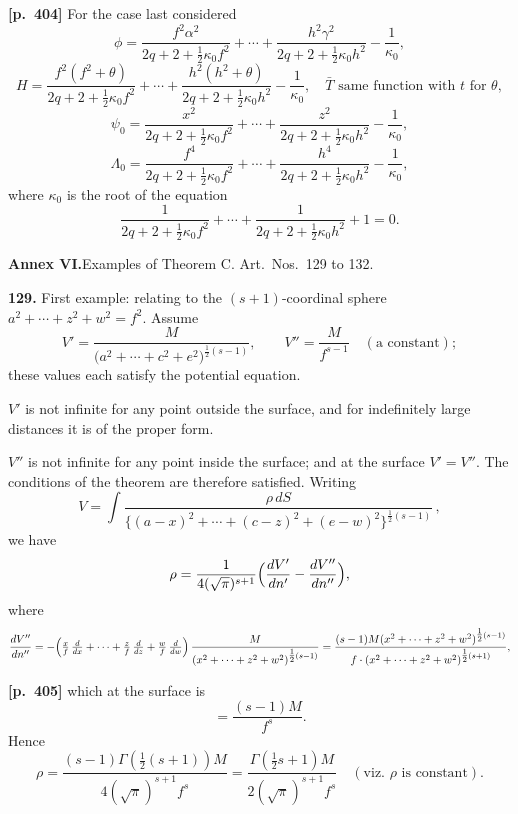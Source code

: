 \documentclass[11pt,a4paper]{article}
\begin{document}
\noindent\textbf{[p.~404]}\quad
For the case last considered
\[
\phi = \frac{f^{2}\alpha^{2}}{2q + 2 + \tfrac{1}{2}\kappa_{0} f^{2}} + \cdots + \frac{h^{2}\gamma^{2}}{2q + 2 + \tfrac{1}{2}\kappa_{0} h^{2}} - \frac{1}{\kappa_{0}},
\]
\[
H = \frac{f^{2}(f^{2}+\theta)}{2q + 2 + \tfrac{1}{2}\kappa_{0} f^{2}} + \cdots + \frac{h^{2}(h^{2}+\theta)}{2q + 2 + \tfrac{1}{2}\kappa_{0} h^{2}} - \frac{1}{\kappa_{0}},\quad \bar{T}\text{ same function with }t\text{ for }\theta,
\]
\[
\psi_{0} = \frac{x^{2}}{2q + 2 + \tfrac{1}{2}\kappa_{0} f^{2}} + \cdots + \frac{z^{2}}{2q + 2 + \tfrac{1}{2}\kappa_{0} h^{2}} - \frac{1}{\kappa_{0}},
\]
\[
\Lambda_{0} = \frac{f^{4}}{2q + 2 + \tfrac{1}{2}\kappa_{0} f^{2}} + \cdots + \frac{h^{4}}{2q + 2 + \tfrac{1}{2}\kappa_{0} h^{2}} - \frac{1}{\kappa_{0}},
\]
where $\kappa_{0}$ is the root of the equation
\[
\frac{1}{2q + 2 + \tfrac{1}{2}\kappa_{0} f^{2}} + \cdots + \frac{1}{2q + 2 + \tfrac{1}{2}\kappa_{0} h^{2}} + 1 = 0.
\]

\bigskip
\begin{center}
\textbf{Annex VI.}\quad Examples of Theorem C. Art.\ Nos.~129 to 132.
\end{center}

\textbf{129.} First example: relating to the $(s + 1)$-coordinal sphere $a^{2} + \cdots + z^{2} + w^{2} = f^{2}$.
Assume
\[
V' = \frac{M}{\bigl(a^{2} + \cdots + c^{2} + e^{2}\bigr)^{\tfrac{1}{2}(s-1)}},\qquad
V'' = \frac{M}{f^{s-1}}\quad(\text{a constant});
\]
these values each satisfy the potential equation.

$V'$ is not infinite for any point outside the surface, and for indefinitely large distances it is of the proper form.

$V''$ is not infinite for any point inside the surface; and at the surface $V' = V''$.
The conditions of the theorem are therefore satisfied. Writing
\[
V = \int \frac{\rho\,dS}{\bigl\{(a-x)^{2} + \cdots + (c-z)^{2} + (e-w)^{2}\bigr\}^{\tfrac{1}{2}(s-1)}}\,,
\]
we have
\[
\rho = \frac{1}{4(\sqrt{\pi})^{s+1}}\Bigl(\frac{dV'}{dn'} - \frac{dV''}{dn''}\Bigr),
\]
where
\[
\frac{dV''}{dn''} = -\Bigl(\tfrac{x}{f}\,\tfrac{d}{dx} + \cdots + \tfrac{z}{f}\,\tfrac{d}{dz} + \tfrac{w}{f}\,\tfrac{d}{dw}\Bigr)\,\frac{M}{(x^{2} + \cdots + z^{2} + w^{2})^{\tfrac{1}{2}(s-1)}}
= \frac{(s-1)M(x^{2} + \cdots + z^{2} + w^{2})^{\tfrac{1}{2}(s-1)}}{f\cdot(x^{2} + \cdots + z^{2} + w^{2})^{\tfrac{1}{2}(s+1)}},
\]

\noindent\textbf{[p.~405]}\quad
which at the surface is
\[
= \frac{(s-1)M}{f^{s}}.
\]
Hence
\[
\rho = \frac{(s-1)\Gamma(\tfrac{1}{2}(s+1))M}{4(\sqrt{\pi})^{s+1}f^{s}} = \frac{\Gamma(\tfrac{1}{2}s + 1)M}{2(\sqrt{\pi})^{s+1}f^{s}}\quad(\text{viz.\ }\rho\text{ is constant}).
\]
\end{document}
